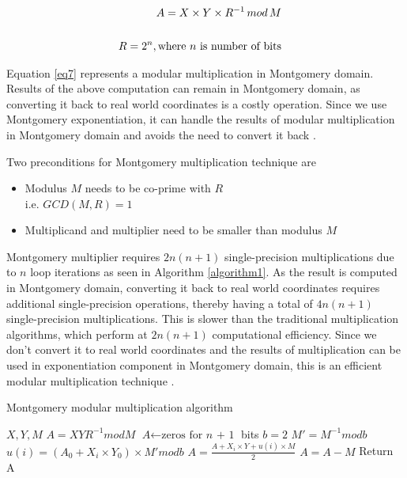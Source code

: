 \documentclass{cpp}
\begin{document}
\begin{equation}
\label{eq7}
\centering
\begin{aligned}
  A = X \times Y \times R^{-1}\,mod\,M\\
  &\\
  R = 2^n, \textrm{where $n$ is number of bits}  
\end{aligned}
\end{equation}

Equation \eqref{eq7} represents a modular multiplication in Montgomery domain. Results of the above computation can remain in Montgomery domain, as converting it back to real world coordinates is a costly operation. Since we use Montgomery exponentiation, it can handle the results of modular multiplication in Montgomery domain and avoids the need to convert it back \cite{manish:amit:aakanksha:abhinav}.

Two preconditions for Montgomery multiplication technique are 

\begin{itemize}

\item Modulus $M$ needs to be co-prime with $R$\\
i.e. $GCD (M, R) = 1$

\item Multiplicand and multiplier need to be smaller than modulus $M$ \cite{nadia:luiza}

\end{itemize}

Montgomery multiplier requires $2n(n+1)$ single-precision multiplications due to $n$ loop iterations as seen in Algorithm \ref{algorithm1}. As the result is computed in Montgomery domain, converting it back to real world coordinates requires additional single-precision operations, thereby having a total of $4n(n+1)$ single-precision multiplications. This is slower than the traditional multiplication algorithms, which perform at $2n (n+1)$ computational efficiency. Since we don't convert it to real world coordinates and the results of multiplication can be used in exponentiation component in Montgomery domain, this is an efficient modular multiplication technique \cite{alfred:paul:scott}.

\begin{algorithm}
\caption{Montgomery modular multiplication algorithm \cite{alfred:paul:scott}}\label{multiply}
\begin{algorithmic}[1]
\State {} $X, Y, M$
\State {} $A = XYR^{-1} mod M$
\State $\textit{A} \gets \text{zeros for }\textit{n + 1}$ bits
\State $b = 2$
\State $M' = M^{-1} mod b$
    \State $u(i) = (A_{0} + X_{i} \times Y_{0}) \times M' mod b$ 
    \State $A = \frac{A + X_{i} \times Y + u(i) \times M}{2}$
\EndFor
{}
    \State $A = A - M$
\EndIf
\State Return A
\end{algorithmic}
\label{algorithm1}
\end{algorithm}
\end{document}
